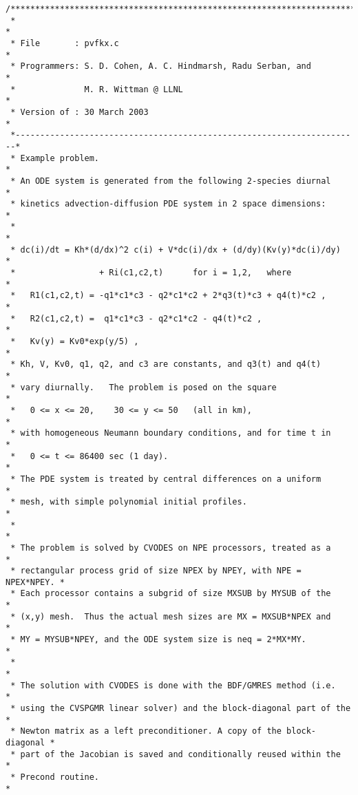\begin{verbatim}
/************************************************************************
 *                                                                      *
 * File       : pvfkx.c                                                 *
 * Programmers: S. D. Cohen, A. C. Hindmarsh, Radu Serban, and          *
 *              M. R. Wittman @ LLNL                                    *
 * Version of : 30 March 2003                                           *
 *----------------------------------------------------------------------*
 * Example problem.                                                     *
 * An ODE system is generated from the following 2-species diurnal      *
 * kinetics advection-diffusion PDE system in 2 space dimensions:       *
 *                                                                      *
 * dc(i)/dt = Kh*(d/dx)^2 c(i) + V*dc(i)/dx + (d/dy)(Kv(y)*dc(i)/dy)    *
 *                 + Ri(c1,c2,t)      for i = 1,2,   where              *
 *   R1(c1,c2,t) = -q1*c1*c3 - q2*c1*c2 + 2*q3(t)*c3 + q4(t)*c2 ,       *
 *   R2(c1,c2,t) =  q1*c1*c3 - q2*c1*c2 - q4(t)*c2 ,                    *
 *   Kv(y) = Kv0*exp(y/5) ,                                             *
 * Kh, V, Kv0, q1, q2, and c3 are constants, and q3(t) and q4(t)        *
 * vary diurnally.   The problem is posed on the square                 *
 *   0 <= x <= 20,    30 <= y <= 50   (all in km),                      *
 * with homogeneous Neumann boundary conditions, and for time t in      *
 *   0 <= t <= 86400 sec (1 day).                                       *
 * The PDE system is treated by central differences on a uniform        *
 * mesh, with simple polynomial initial profiles.                       *
 *                                                                      *
 * The problem is solved by CVODES on NPE processors, treated as a      *
 * rectangular process grid of size NPEX by NPEY, with NPE = NPEX*NPEY. *
 * Each processor contains a subgrid of size MXSUB by MYSUB of the      *
 * (x,y) mesh.  Thus the actual mesh sizes are MX = MXSUB*NPEX and      *
 * MY = MYSUB*NPEY, and the ODE system size is neq = 2*MX*MY.           *
 *                                                                      *
 * The solution with CVODES is done with the BDF/GMRES method (i.e.     *
 * using the CVSPGMR linear solver) and the block-diagonal part of the  *
 * Newton matrix as a left preconditioner. A copy of the block-diagonal *
 * part of the Jacobian is saved and conditionally reused within the    *
 * Precond routine.                                                     *

\end{verbatim}
